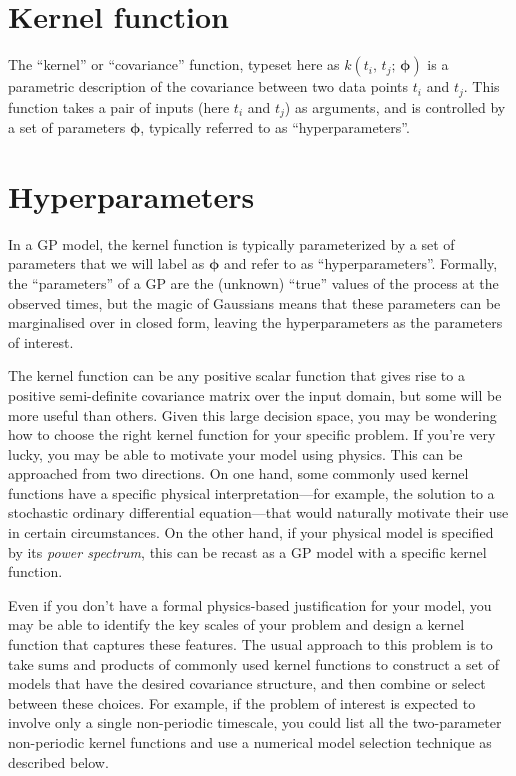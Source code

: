 \documentclass[letterpaper]{ar-1col}
\newcommand{\suz}[1]{\textcolor{magenta}{#1}}
\newcommand{\hyperparams}{\ensuremath{\boldsymbol{\phi}}}
\begin{document}
\begin{textbox}[htb]
  \section{Kernel function}
  The ``kernel'' or ``covariance'' function, typeset here as $k(t_i,\,t_j;\,\hyperparams)$ is a parametric description of the covariance between two data points $t_i$ and $t_j$. This function takes a pair of inputs (here $t_i$ and $t_j$) as arguments, and is controlled by a set of parameters $\hyperparams$, typically referred to as ``hyperparameters''.

  \vspace{1.5em}

  \section{Hyperparameters}
  In a GP model, the kernel function is typically parameterized by a set of parameters that we will label as $\hyperparams$ and refer to as ``hyperparameters''.
  Formally, the ``parameters'' of a GP are the (unknown) ``true'' values of the process at the observed times, but the magic of Gaussians means that these parameters can be marginalised over in closed form, leaving the hyperparameters as the parameters of interest.
\end{textbox}

The kernel function can be any positive scalar function that gives rise to a positive semi-definite covariance matrix over the input domain, but some will be more useful than others.
Given this large decision space, you may be wondering how to choose the right kernel function for your specific problem.
If you're very lucky, you may be able to motivate your model using physics.
This can be approached from two directions.
On one hand, some commonly used kernel functions have a specific physical interpretation---for example, the solution to a stochastic ordinary differential equation---that would naturally motivate their use in certain circumstances.
On the other hand, if your physical model is specified by its \emph{power spectrum}, this can be recast as a GP model with a specific kernel function.

Even if you don't have a formal physics-based justification for your model, you may be able to identify the key scales of your problem and design a kernel function that captures these features.
The usual approach to this problem is to take sums and products of commonly used kernel functions to construct a set of models that have the desired covariance structure, and then combine or select between these choices.
For example, if the problem of interest is expected to involve only a single non-periodic timescale, you could list all the two-parameter non-periodic kernel functions and use a numerical model selection technique as described below.
\end{document}
